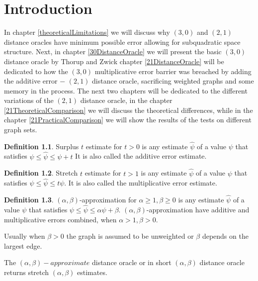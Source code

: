 \documentclass[shortabstract, lic, english]{iithesis}
\author         {Artur Błaszkiewicz}
\theoremstyle{definition} \newtheorem{definition}{Definition}[chapter]
\theoremstyle{remark} \newtheorem{remark}[definition]{Observation}
\theoremstyle{plain} \newtheorem{theorem}[definition]{Theorem}
\theoremstyle{plain} \newtheorem{lemma}[definition]{Lemma}
\theoremstyle{plain} \newtheorem{conjecture}[definition]{Conjecture}
\begin{document}

\chapter{Introduction}

In chapter \ref{theoreticalLimitations} we will discuss why $(3,0)$ and $(2,1)$ distance oracles
have minimum possible error allowing for subquadratic space structure.
Next, in chapter \ref{30DistanceOracle} we will present the basic $(3,0)$ distance oracle by Thorup and Zwick \cite{a0OraclesBasic}
chapter \ref{21DistanceOracle} will be dedicated to how the $(3,0)$ multiplicative error barrier was breached by adding the additive error $-$
$(2,1)$ distance oracle, sacrificing weighted graphs and some memory in the process.
The next two chapters will be dedicated to the different variations of the $(2,1)$ distance oracle,
in the chapter \ref{21TheoreticalComparison} we will discuss the theoretical differences,
while in the chapter \ref{21PracticalComparison} we will show the results of the tests on different graph sets.

\begin{definition}
    Surplus $t$ estimate for $t>0$ is any estimate $\hat{\psi}$ of a value $\psi$ that satisfies $\psi \leq \hat{\psi} \leq \psi + t$
    It is also called the additive error estimate.
\end{definition}

\begin{definition}
    Stretch $t$ estimate for $t>1$ is any estimate $\hat{\psi}$ of a value $\psi$ that satisfies $\psi \leq \hat{\psi} \leq t\psi$.
    It is also called the multiplicative error estimate.
\end{definition}

\begin{definition}
    $(\alpha, \beta)$-approximation for $\alpha \geq 1, \beta \geq 0$ is any estimate $\hat{\psi}$ of a value $\psi$ that satisfies $\psi \leq \hat{\psi} \leq \alpha\psi + \beta$.
    $(\alpha, \beta)$-approximation have additive and multiplicative errors combined, when $\alpha > 1, \beta > 0$.
\end{definition}
    Usually when $\beta > 0$ the graph is assumed to be unweighted or $\beta$ depends on the largest edge.

The $(\alpha,\beta)-approximate$ distance oracle or in short $(\alpha,\beta)$ distance oracle returns stretch $(\alpha,\beta)$ estimates.
\end{document}
